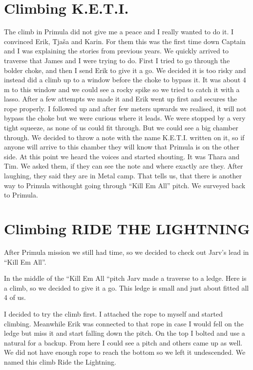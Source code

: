 
\section{Climbing K.E.T.I.}\label{climbing-k.e.t.i.}

The climb in Primula did not give me a peace and I really wanted to do
it. I convinced Erik, Tjaša and Karin. For them this was the first time
down Captain and I was explaining the stories from previous years. We
quickly arrived to traverse that James and I were trying to do. First I
tried to go through the bolder choke, and then I send Erik to give it a
go. We decided it is too risky and instead did a climb up to a window
before the choke to bypass it. It was about 4 m to this window and we
could see a rocky spike so we tried to catch it with a lasso. After a
few attempts we made it and Erik went up first and secures the rope
properly. I followed up and after few meters upwards we realised, it
will not bypass the choke but we were curious where it leads. We were
stopped by a very tight squeeze, as none of us could fit through. But we
could see a big chamber through. We decided to throw a note with the
name K.E.T.I. written on it, so if anyone will arrive to this chamber
they will know that Primula is on the other side. At this point we heard
the voices and started shouting. It was Thara and Tim. We asked them, if
they can see the note and where exactly are they. After laughing, they
said they are in Metal camp. That tells us, that there is another way to
Primula withought going through ``Kill Em All'' pitch. We surveyed back
to Primula.


\section{Climbing RIDE THE LIGHTNING}\label{climbing-ride-the-lightning}

After Primula mission we still had time, so we decided to check out
Jarv's lead in ``Kill Em All''.

In the middle of the ``Kill Em All ``pitch Jarv made a traverse to a
ledge. Here is a climb, so we decided to give it a go. This ledge is
small and just about fitted all 4 of us.

I decided to try the climb first. I attached the rope to myself and
started climbing. Meanwhile Erik was connected to that rope in case I
would fell on the ledge but miss it and start falling down the pitch. On
the top I bolted and use a natural for a backup. From here I could see a
pitch and others came up as well. We did not have enough rope to reach
the bottom so we left it undescended. We named this climb Ride the
Lightning.

